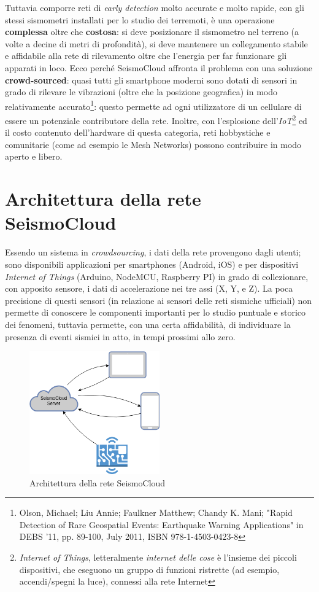 \documentclass[a4paper,10pt]{memoir}
\begin{document}
Tuttavia comporre reti di \textit{early detection} molto accurate e molto rapide, con gli stessi sismometri installati per lo studio dei terremoti, è una operazione \textbf{complessa} oltre che \textbf{costosa}: si deve posizionare il sismometro nel terreno (a volte a decine di metri di profondità), si deve mantenere un collegamento stabile e affidabile alla rete di rilevamento oltre che l'energia per far funzionare gli apparati in loco. Ecco perché SeismoCloud affronta il problema con una soluzione \textbf{crowd-sourced}: quasi tutti gli smartphone moderni sono dotati di sensori in grado di rilevare le vibrazioni (oltre che la posizione geografica) in modo relativamente accurato\footnote{Olson, Michael; Liu Annie; Faulkner Matthew; Chandy K. Mani; "Rapid Detection of Rare Geospatial Events: Earthquake Warning Applications" in DEBS '11, pp. 89-100, July 2011, ISBN 978-1-4503-0423-8}: questo permette ad ogni utilizzatore di un cellulare di essere un potenziale contributore della rete. Inoltre, con l'esplosione dell'\textit{IoT}\footnote{\textit{Internet of Things}, letteralmente \textit{internet delle cose} è l'insieme dei piccoli dispositivi, che eseguono un gruppo di funzioni ristrette (ad esempio, accendi/spegni la luce), connessi alla rete Internet} ed il costo contenuto dell'hardware di questa categoria, reti hobbystiche e comunitarie (come ad esempio le Mesh Networks) possono contribuire in modo aperto e libero.

\section{Architettura della rete SeismoCloud}

Essendo un sistema in \textit{crowdsourcing}, i dati della rete provengono dagli utenti; sono disponibili applicazioni per smartphones (Android, iOS) e per dispositivi \textit{Internet of Things} (Arduino, NodeMCU, Raspberry PI) in grado di collezionare, con apposito sensore, i dati di accelerazione nei tre assi (X, Y, e Z). La poca precisione di questi sensori (in relazione ai sensori delle reti sismiche ufficiali) non permette di conoscere le componenti importanti per lo studio puntuale e storico dei fenomeni, tuttavia permette, con una certa affidabilità, di individuare la presenza di eventi sismici in atto, in tempi prossimi allo zero.

\begin{figure}[ht]
\centering
\label{fig:scsarch}
\caption{Architettura della rete SeismoCloud}
\includegraphics[width=0.5\textwidth]{introduzione/SeismoCloud_arch}
\end{figure}
\end{document}
